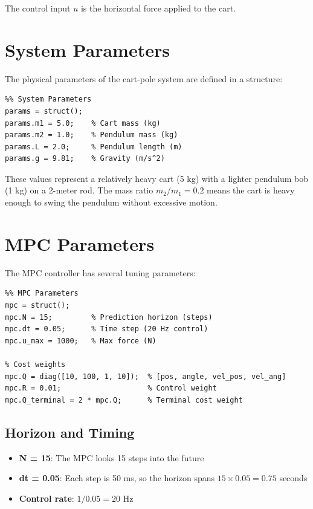 \documentclass[11pt]{article}
\begin{document}
The control input $u$ is the horizontal force applied to the cart.

\section{System Parameters}

The physical parameters of the cart-pole system are defined in a structure:

\begin{lstlisting}
%% System Parameters
params = struct();
params.m1 = 5.0;    % Cart mass (kg)
params.m2 = 1.0;    % Pendulum mass (kg)
params.L = 2.0;     % Pendulum length (m)
params.g = 9.81;    % Gravity (m/s^2)
\end{lstlisting}

These values represent a relatively heavy cart (5 kg) with a lighter pendulum bob (1 kg) on a 2-meter rod. The mass ratio $m_2/m_1 = 0.2$ means the cart is heavy enough to swing the pendulum without excessive motion.

\section{MPC Parameters}

The MPC controller has several tuning parameters:

\begin{lstlisting}
%% MPC Parameters
mpc = struct();
mpc.N = 15;         % Prediction horizon (steps)
mpc.dt = 0.05;      % Time step (20 Hz control)
mpc.u_max = 1000;   % Max force (N)

% Cost weights
mpc.Q = diag([10, 100, 1, 10]);  % [pos, angle, vel_pos, vel_ang]
mpc.R = 0.01;                    % Control weight
mpc.Q_terminal = 2 * mpc.Q;      % Terminal cost weight
\end{lstlisting}

\subsection{Horizon and Timing}

\begin{itemize}
    \item \textbf{N = 15}: The MPC looks 15 steps into the future
    \item \textbf{dt = 0.05}: Each step is 50 ms, so the horizon spans $15 \times 0.05 = 0.75$ seconds
    \item \textbf{Control rate}: $1/0.05 = 20$ Hz
\end{itemize}
\end{document}
